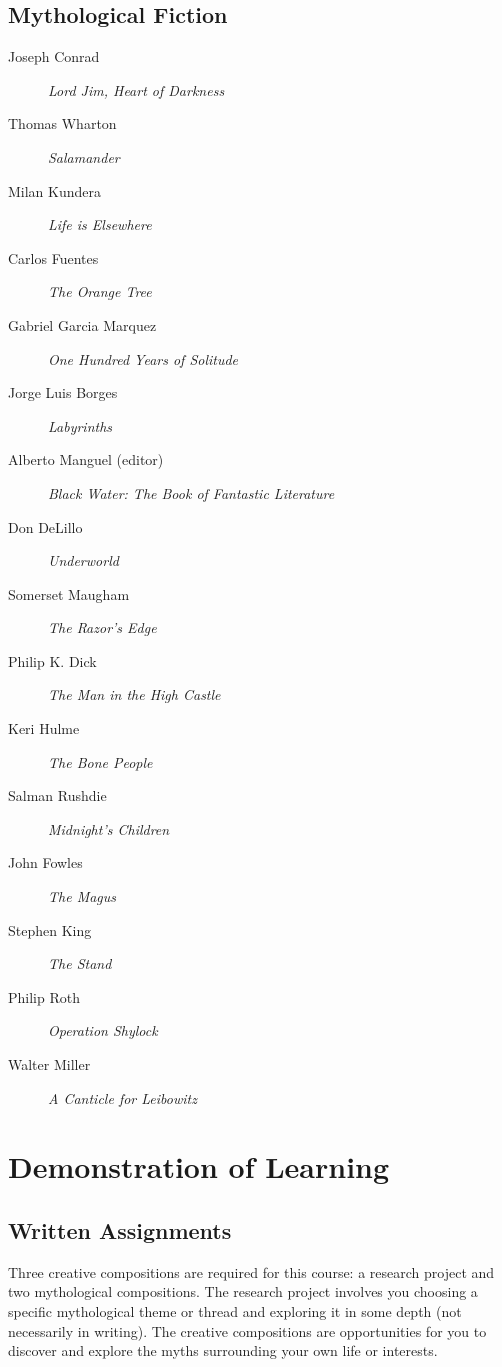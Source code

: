 \documentclass[letterpaper,10pt,headsepline]{scrreprt}
\begin{document}
\subsection{Mythological Fiction}
\begin{description}
\item [Joseph Conrad] \textit{Lord Jim, Heart of Darkness\/}
\item [Thomas Wharton] \textit{Salamander\/}
\item [Milan Kundera] \textit{Life is Elsewhere\/}
\item [Carlos Fuentes] \textit{The Orange Tree\/}
\item [Gabriel Garcia Marquez] \textit{One Hundred Years of Solitude\/}
\item [Jorge Luis Borges] \textit{Labyrinths\/}
\item [Alberto Manguel (editor)] \textit{Black Water: The Book of
    Fantastic Literature\/}
\item [Don DeLillo] \textit{Underworld\/}
\item [Somerset Maugham] \textit{The Razor's Edge\/}
\item [Philip K. Dick] \textit{The Man in the High Castle\/}
\item [Keri Hulme] \textit{The Bone People\/}
\item [Salman Rushdie] \textit{Midnight's Children\/}
\item [John Fowles] \textit{The Magus\/}
\item [Stephen King] \textit{The Stand\/}
\item [Philip Roth] \textit{Operation Shylock\/}
\item [Walter Miller] \textit{A Canticle for Leibowitz\/}
\end{description}

\clearpage

\section{Demonstration of Learning}

\subsection{Written Assignments}
Three creative compositions are required for this course: a research project and two mythological compositions. The research project involves you choosing a specific mythological theme or thread and exploring it in some depth (not necessarily in writing). The creative compositions are opportunities for you to discover and explore the myths surrounding your own life or interests.
\end{document}
